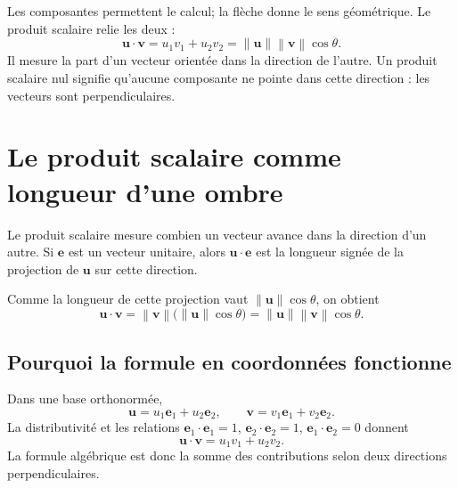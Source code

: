 \documentclass[12pt,a4paper,openany]{book}
\newcommand{\norm}[1]{\left\lVert #1\right\rVert}
\begin{document}
\begin{connectionbox}
Les composantes permettent le calcul; la flèche donne le sens géométrique. Le produit scalaire relie les deux :
\[
\mathbf u\cdot\mathbf v=u_1v_1+u_2v_2
=\norm{\mathbf u}\norm{\mathbf v}\cos\theta.
\]
Il mesure la part d'un vecteur orientée dans la direction de l'autre. Un produit scalaire nul signifie qu'aucune composante ne pointe dans cette direction : les vecteurs sont perpendiculaires.
\end{connectionbox}


\section{Le produit scalaire comme longueur d'une ombre}

Le produit scalaire mesure combien un vecteur avance dans la direction d'un autre. Si $\mathbf e$ est un vecteur unitaire, alors $\mathbf u\cdot\mathbf e$ est la longueur signée de la projection de $\mathbf u$ sur cette direction.

\begin{center}
\end{center}

Comme la longueur de cette projection vaut $\norm{\mathbf u}\cos\theta$, on obtient
\[
\mathbf u\cdot\mathbf v
=\norm{\mathbf v}\bigl(\norm{\mathbf u}\cos\theta\bigr)
=\norm{\mathbf u}\norm{\mathbf v}\cos\theta.
\]

\subsection{Pourquoi la formule en coordonnées fonctionne}
Dans une base orthonormée,
\[
\mathbf u=u_1\mathbf e_1+u_2\mathbf e_2,
\qquad
\mathbf v=v_1\mathbf e_1+v_2\mathbf e_2.
\]
La distributivité et les relations $\mathbf e_1\cdot\mathbf e_1=1$, $\mathbf e_2\cdot\mathbf e_2=1$, $\mathbf e_1\cdot\mathbf e_2=0$ donnent
\[
\mathbf u\cdot\mathbf v=u_1v_1+u_2v_2.
\]
La formule algébrique est donc la somme des contributions selon deux directions perpendiculaires.
\end{document}
